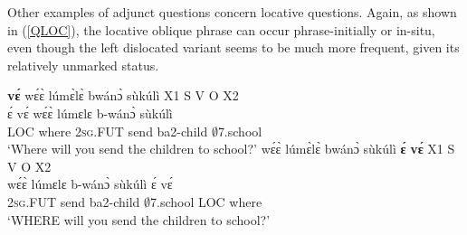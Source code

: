 

Other examples of adjunct questions concern locative questions. Again, as shown in (\ref{QLOC}), the locative oblique phrase can occur phrase-initially or in-situ, even though the left dislocated variant seems to be much more frequent, given its relatively unmarked status.

\begin{exe}
\ex\label{QLOC} 
\begin{xlist} 
\ex\label{QLOCa} 
   {\bfseries vɛ́} wɛ́ɛ̀ lúmɛ̀lɛ̀ bwánɔ̀ sùkúlì  \hfill X1 S V O X2 \\
              ɛ́ vɛ́ wɛ́ɛ̀ lúmɛlɛ b-wánɔ̀ sùkúlì \\
               LOC where 2\textsc{sg}.FUT send ba2-child $\emptyset$7.school \\ 
    \trans `Where will you send the children to school?'
\ex\label{QLOCb} 
  \glll      wɛ́ɛ̀ lúmɛ̀lɛ̀ bwánɔ̀ sùkúlì {\bfseries ɛ́} {\bfseries vɛ́}  \hfill X1 S V O X2 \\
               wɛ́ɛ̀ lúmɛlɛ b-wánɔ̀ sùkúlì ɛ́ vɛ́\\
                2\textsc{sg}.FUT send ba2-child $\emptyset$7.school LOC where \\
    \trans `WHERE will you send the children to school?'
\end{xlist}
\end {exe}

